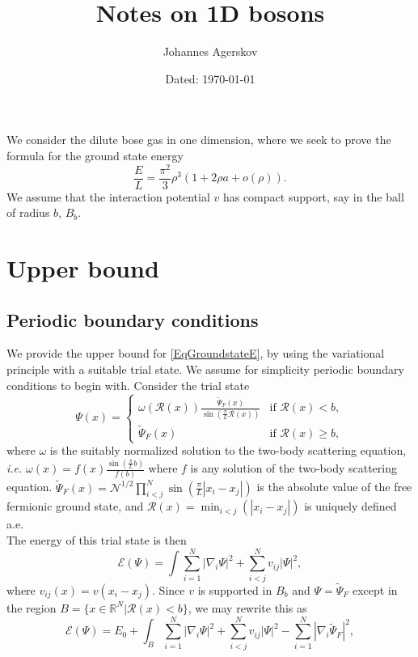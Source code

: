 \documentclass[a4paper,11pt]{article}
\author{Johannes Agerskov}
\date{Dated: \today}
\title{Notes on 1D bosons}
\newcommand{\abs}[1]{\left\lvert #1 \right\rvert}
\newcommand{\ie}{\emph{i.e.} }
\newcommand{\R}{\mathbb{R}}
\newcommand{\rr}{\mathcal{R}}
\numberwithin{equation}{section}
\begin{document}
	\maketitle
	We consider the dilute bose gas in one dimension, where we seek to prove the formula for the ground state energy \begin{equation}\label{EqGroundstateE}
	\frac{E}{L}=\frac{\pi^2}{3}\rho^3\left(1+2\rho a+ o\left(\rho \right)\right).
	\end{equation} 
	We assume that the interaction potential $ v $ has compact support, say in the ball of radius $ b $, $ B_b $.
	\section{Upper bound}
	\subsection{Periodic boundary conditions}
	We provide the upper bound for \eqref{EqGroundstateE}, by using the variational principle with a suitable trial state. We assume for simplicity periodic boundary conditions to begin with.
	 Consider the trial state\begin{equation}
	\Psi(x)=\begin{cases}
	\omega(\rr(x))\frac{\tilde{\Psi}_F(x)}{\sin\left(\frac{\pi}{L}\rr(x)\right)}& \text{if }\rr(x)<b,\\
	\tilde{\Psi}_F(x)&\text{if }\rr(x)\geq b,
	\end{cases}
	\end{equation}
	where $ \omega $ is the suitably normalized solution to the two-body scattering equation, \ie $ \omega(x)=f(x)\frac{\sin\left(\frac{\pi}{L}b\right)}{f(b)} $ where $ f $ is any solution of the two-body scattering equation.  $ \tilde{\Psi}_F(x)=\mathcal{N}^{1/2}\prod_{i<j}^{N}\sin\left(\frac{\pi}{L}\abs{x_i-x_j}\right) $ is the absolute value of the free fermionic ground state, and $ \rr(x)=\min_{i<j}(\abs{x_i-x_j}) $ is uniquely defined a.e.\\
	The energy of this trial state is then\begin{equation}
	\mathcal{E}(\Psi)=\int \sum_{i=1}^{N}\abs{\nabla_i\Psi}^2+\sum_{i<j}^{N}v_{ij}\abs{\Psi}^2,
	\end{equation}
	where $ v_{ij}(x)=v(x_i-x_j) $. Since $ v $ is supported in $ B_b $ and $ \Psi=\tilde{\Psi}_F $ except in the region $ B=\{x\in\R^N \vert \rr(x)<b \} $, we may rewrite this as \begin{equation}
	\mathcal{E}(\Psi)=E_0+\int_B \sum_{i=1}^{N}\abs{\nabla_i\Psi}^2+\sum_{i<j}^{N}v_{ij}\abs{\Psi}^2-\sum_{i=1}^{N}\abs{\nabla_i\tilde{\Psi}_F}^2,
	\end{equation}
\end{document}
